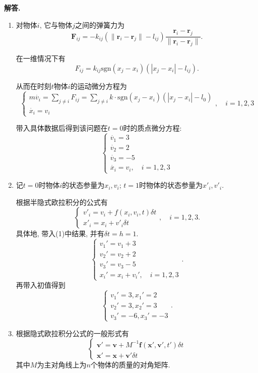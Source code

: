 \documentclass[11pt]{article}
\newcommand{\norm}[1]{\|{#1}\|}
\newenvironment{solution}{\par\noindent\textbf{解答. }}{\par}
\begin{document}
	\section{}
	\begin{solution}
		\begin{enumerate}[(1)]
			\item 对物体$i$, 它与物体$j$之间的弹簧力为$$\bm{F}_{ij}=-k_{ij}(\norm{\bm{r}_i-\bm{r}_j}-l_{ij})\frac{\bm{r}_i-\bm{r}_j}{\norm{\bm{r}_i-\bm{r}_j}}.$$
			
			在一维情况下有$$F_{ij}=k_{ij}\mathrm{sgn}(x_j-x_i)(|x_j-x_i|-l_{ij}).$$

			从而在时刻$t$物体$i$的运动微分方程为 $$\begin{cases}
				m\dot{v_i}=\sum\limits_{j\neq i}F_{ij}=\sum\limits_{j\neq i} k\cdot\mathrm{sgn}(x_j-x_i)(|x_j-x_i|-l_0) \\
				\dot{x_i}=v_i	
			\end{cases},\quad i=1,2,3$$

			带入具体数据后得到该问题在$t=0$时的质点微分方程: $$\begin{cases}
				\dot{v_1}=3 \\
				\dot{v_2}=2 \\
				\dot{v_3}=-5 \\
				\dot{x_i}=v_i,\quad i=1,2,3
			\end{cases}$$
			\item 记$t=0$时物体$i$的状态参量为$x_i,v_i$; $t=1$时物体的状态参量为$x'_i,v'_i$.
			
			根据半隐式欧拉积分的公式有$$\begin{cases}
				v'_i=v_i+f(x_i,v_i,t)\delta t \\
				x'_i=x_i+v'_i\delta t
			\end{cases},\quad i=1,2,3. $$
			具体地, 带入(1)中结果, 并有$\delta t = h =1$. $$\begin{cases}
				v_1'=v_1+3 \\
				v_2'=v_2+2 \\
				v_3'=v_3-5 \\
				x_i'=x_i+v_i',\quad i=1,2,3
			\end{cases}.$$
			再带入初值得到 $$\begin{cases}
				v_1'=3, x_1'=2 \\
				v_2'=3, x_2'=3 \\
				v_3'=-6, x_3'=-3
			\end{cases}.$$
			
			\item 根据隐式欧拉积分公式的一般形式有$$\begin{cases}
				\bm{v}'=\bm{v}+M^{-1}\bm{f}(\bm{x}',\bm{v}',t')\delta t \\
				\bm{x}'=\bm{x}+\bm{v}'\delta t
			\end{cases} $$ 其中$M$为主对角线上为$n$个物体的质量的对角矩阵.


\end{enumerate}
\end{solution}
\end{document}
